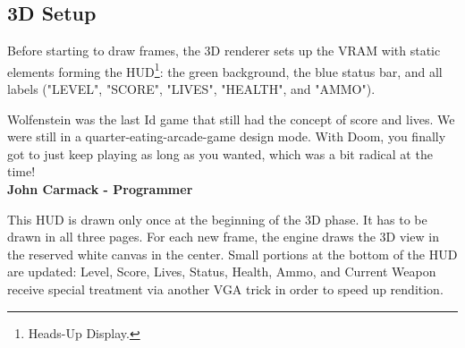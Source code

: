 \subsection{3D Setup}
Before starting to draw frames, the 3D renderer sets up the VRAM with static elements forming the HUD\footnote{Heads-Up Display.}: the green background, the blue status bar, and all labels ("LEVEL", "SCORE", "LIVES", "HEALTH", and "AMMO").\\
\par
 \begin{fancyquotes}
   Wolfenstein was the last Id game that still had the concept of score and lives.  We were still in a quarter-eating-arcade-game design mode. With Doom, you finally got to just keep playing as long as you wanted, which was a bit radical at the time!
 \bigskip \\
\textbf{John Carmack - Programmer}
 \end{fancyquotes}
\begin{figure}[H]
  \centering
\end{figure}
This HUD is drawn only once at the beginning of the 3D phase. It has to be drawn in all three pages. For each new frame, the engine draws the 3D view in the reserved white canvas in the center. Small portions at the bottom of the HUD are updated: Level, Score, Lives, Status, Health, Ammo, and Current Weapon receive special treatment via another VGA trick in order to speed up rendition.\\
\par

